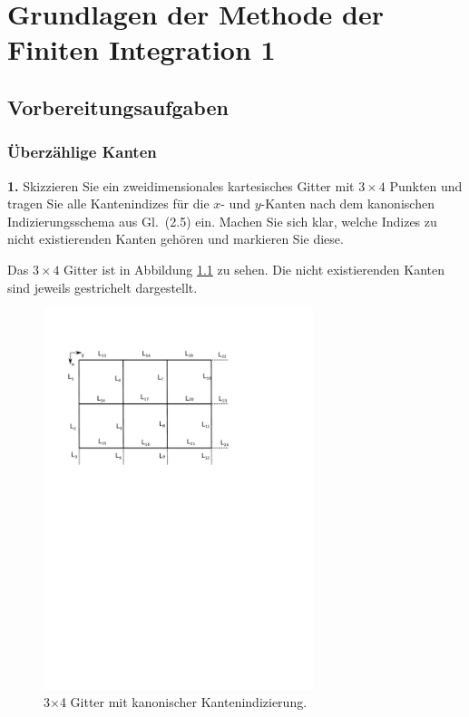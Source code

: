 \documentclass[Protokollheft.tex]{subfiles}
\begin{document}
\chapter{Grundlagen der Methode der Finiten Integration 1}
\section{Vorbereitungsaufgaben}
    {\subsection{Überzählige Kanten}}

        \begin{framed}
	\noindent \textbf{1.} Skizzieren Sie ein zweidimensionales kartesisches Gitter mit
        $3\times 4$ Punkten und tragen Sie alle Kantenindizes für die $x$-
        und $y$-Kanten nach dem kanonischen Indizierungsschema aus Gl.~(2.5) ein. Machen Sie sich klar, welche Indizes zu
        nicht existierenden Kanten gehören und markieren Sie diese.\label{exer:edgeIndices}
\end{framed}
\noindent
	Das $3\times 4$ Gitter ist in Abbildung \ref{Abb:1.1} zu sehen. Die nicht existierenden Kanten sind jeweils gestrichelt dargestellt.
	\begin{figure}[h!]
		\centering
		\includegraphics[trim = 10mm 170mm 65mm 20mm, clip, width=0.7\textwidth]{Zeichnung.pdf}
		\caption{3$\times$4 Gitter mit kanonischer Kantenindizierung.}
		\label{Abb:1.1}
	\end{figure}
\end{document}

